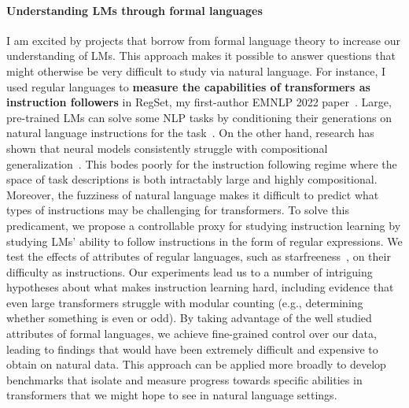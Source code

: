 \documentclass[11pt]{article}
\begin{document}
\paragraph{Understanding LMs through formal languages}

I am excited by projects 
that borrow from formal language theory
to increase our understanding of LMs.
This approach makes it possible to answer 
questions that might otherwise be very difficult to study via natural language.
For instance, I used regular languages to 
\textbf{measure the capabilities of transformers as instruction followers}
in RegSet, my first-author EMNLP 2022 paper~\cite{Finlayson2022WhatMI}. 
Large, pre-trained LMs can solve some NLP tasks 
by conditioning their generations on natural language instructions 
for the task~\cite{mishra2021crosstask, Wei2021FinetunedLM}. 
On the other hand, 
research has shown that neural models consistently struggle with
compositional generalization~\cite{Lake2018GeneralizationWS}. 
This bodes poorly for the instruction following regime
where the space of task descriptions is both intractably large 
and highly compositional.
Moreover, the fuzziness of natural language makes it difficult to
predict what types of instructions may be challenging for transformers.
To solve this predicament, 
we propose a controllable proxy for studying instruction learning
by studying LMs' ability to follow instructions in the form of regular expressions.
We test the effects of attributes of regular languages,
such as starfreeness~\cite{Salomaa1981JewelsOF}, on their difficulty as instructions.
Our experiments lead us to a number of intriguing hypotheses 
about what makes instruction learning hard, 
including evidence that even large transformers struggle with modular counting 
(e.g., determining whether something is even or odd). 
By taking advantage of the well studied attributes of formal languages,
we achieve fine-grained control over our data, leading to findings that
would have been extremely difficult and expensive to obtain on natural data.
This approach can be applied more broadly to develop benchmarks 
that isolate and measure progress towards specific abilities 
in transformers that we might hope to see in natural language settings.
\end{document}
